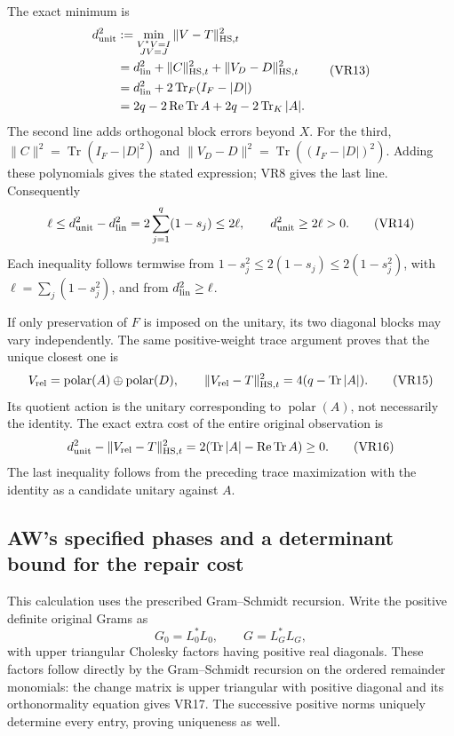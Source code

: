 The exact minimum is
\[
 \begin{aligned}
 d_{\rm unit}^2
 &:=\min_{\substack{V^\star V=I\\JV=J}}\|V-T\|_{\mathrm{HS},t}^2\\
 &=d_{\rm lin}^2+\|C\|_{\mathrm{HS},t}^2
                    +\|V_D-D\|_{\mathrm{HS},t}^2\\
 &=d_{\rm lin}^2+2\operatorname{Tr}_F(I_F-|D|)\\
 &=2q-2\operatorname{Re}\operatorname{Tr}A
       +2q-2\operatorname{Tr}_K|A|.
 \end{aligned} \tag{VR13}
\]
The second line adds orthogonal block errors beyond \(X\). For the third,
\(\|C\|^2=\operatorname{Tr}(I_F-|D|^2)\) and
\(\|V_D-D\|^2=\operatorname{Tr}((I_F-|D|)^2)\).
Adding these polynomials gives the stated expression; VR8 gives the last line. Consequently
\[
 \ell\le d_{\rm unit}^2-d_{\rm lin}^2
 =2\sum_{j=1}^q(1-s_j)\le2\ell,\qquad
 d_{\rm unit}^2\ge2\ell>0. \tag{VR14}
\]
Each inequality follows termwise from
\(1-s_j^2\le2(1-s_j)\le2(1-s_j^2)\), with
\(\ell=\sum_j(1-s_j^2)\), and from \(d_{\rm lin}^2\ge\ell\).

If only preservation of \(F\) is imposed on the unitary, its two diagonal blocks may vary independently. The same positive-weight trace argument proves that the unique closest one is
\[
 V_{\rm rel}=\operatorname{polar}(A)\oplus\operatorname{polar}(D),\qquad
 \|V_{\rm rel}-T\|_{\mathrm{HS},t}^2
 =4(q-\operatorname{Tr}|A|). \tag{VR15}
\]
Its quotient action is the unitary corresponding to \(\operatorname{polar}(A)\), not necessarily the identity. The exact extra cost of the entire original observation is
\[
 d_{\rm unit}^2-\|V_{\rm rel}-T\|_{\mathrm{HS},t}^2
 =2(\operatorname{Tr}|A|-\operatorname{Re}\operatorname{Tr}A)\ge0.
 \tag{VR16}
\]
The last inequality follows from the preceding trace maximization with the identity as a candidate unitary against \(A\).

\subsection{AW's specified phases and a determinant bound for the repair cost}

This calculation uses the prescribed Gram--Schmidt recursion. Write the positive definite original Grams as
\[
 G_0=L_0^*L_0,\qquad G=L_G^*L_G, \tag{VR17}
\]
with upper triangular Cholesky factors having positive real diagonals. These factors follow directly by the Gram--Schmidt recursion on the ordered remainder monomials: the change matrix is upper triangular with positive diagonal and its orthonormality equation gives VR17. The successive positive norms uniquely determine every entry, proving uniqueness as well.

